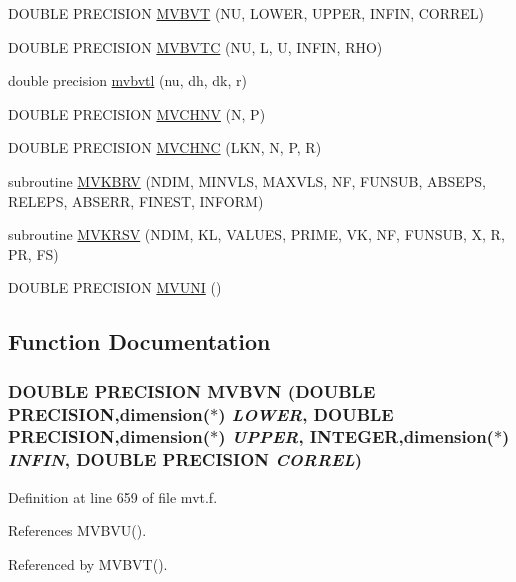 \begin{CompactItemize}
\item 
DOUBLE PRECISION \hyperlink{mvt_8f_9d0fae33894aee91124b4f3695494f7e}{MVBVT} (NU, LOWER, UPPER, INFIN, CORREL)
\item 
DOUBLE PRECISION \hyperlink{mvt_8f_597ed59b5410765b8afcc6527c9552e7}{MVBVTC} (NU, L, U, INFIN, RHO)
\item 
double precision \hyperlink{mvt_8f_9194afe3b3514326417468c9e9f43f0e}{mvbvtl} (nu, dh, dk, r)
\item 
DOUBLE PRECISION \hyperlink{mvt_8f_3652f2cb737bf864d78fff1a650ca287}{MVCHNV} (N, P)
\item 
DOUBLE PRECISION \hyperlink{mvt_8f_81b566eaa4178de04b31e15475cde3bf}{MVCHNC} (LKN, N, P, R)
\item 
subroutine \hyperlink{mvt_8f_53a2e447659c04eb0ad551cf58c77d37}{MVKBRV} (NDIM, MINVLS, MAXVLS, NF, FUNSUB, ABSEPS, RELEPS, ABSERR, FINEST, INFORM)
\item 
subroutine \hyperlink{mvt_8f_6b32b1cb4d3243c9ffef2622d8cfa65d}{MVKRSV} (NDIM, KL, VALUES, PRIME, VK, NF, FUNSUB, X, R, PR, FS)
\item 
DOUBLE PRECISION \hyperlink{mvt_8f_1ab822a6524a9096bf2ec00253f890e3}{MVUNI} ()
\end{CompactItemize}


\subsection{Function Documentation}
\hypertarget{mvt_8f_01b86430a337d3d8b91bcf9346d7dd3b}{
\subsubsection[{MVBVN}]{\setlength{\rightskip}{0pt plus 5cm}DOUBLE PRECISION MVBVN (DOUBLE PRECISION,dimension($\ast$) {\em LOWER}, \/  DOUBLE PRECISION,dimension($\ast$) {\em UPPER}, \/  INTEGER,dimension($\ast$) {\em INFIN}, \/  DOUBLE PRECISION {\em CORREL})}}
\label{mvt_8f_01b86430a337d3d8b91bcf9346d7dd3b}




Definition at line 659 of file mvt.f.

References MVBVU().

Referenced by MVBVT().

